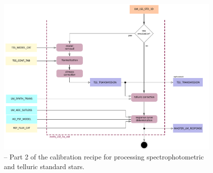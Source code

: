 \begin{figure}[ht]
  \centering
  \includegraphics[width=0.6\textheight]{figures/metis_lm_lss_std_v0.8_part_2.pdf}
  \caption[Recipe: ]{ --
    Part 2 of the calibration recipe for processing spectrophotometric and telluric standard stars.}
  \label{Fig:rec_lm_lss_flux2}
\end{figure}
\clearpage
